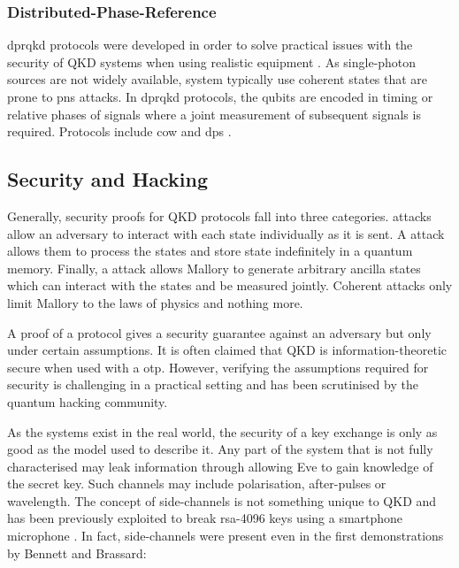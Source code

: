 
\subsubsection{Distributed-Phase-Reference}

\Ac{dprqkd} protocols were developed in order to solve practical issues with the security of \ac{QKD} systems when using realistic equipment \cite{diamanti2016practical}. As single-photon sources are not widely available, system typically use coherent states that are prone to \ac{pns} attacks. In \ac{dprqkd} protocols, the qubits are encoded in timing or relative phases of signals where a joint measurement of subsequent signals is required. Protocols include \ac{cow} \cite{COW-QKD} and \ac{dps} \cite{DPS-QKD}.

\subsection{Security and Hacking}

Generally, security proofs for \ac{QKD} protocols fall into three categories.  attacks allow an adversary to interact with each state individually as it is sent. A  attack allows them to process the states and store state indefinitely in a quantum memory. Finally, a  attack allows Mallory to generate arbitrary ancilla states which can interact with the states and be measured jointly. Coherent attacks only limit Mallory to the laws of physics and nothing more.

A proof of a protocol gives a security guarantee against an adversary but only under certain assumptions. It is often claimed that \ac{QKD} is information-theoretic secure when used with a \ac{otp}. However, verifying the assumptions required for security is challenging in a practical setting and has been scrutinised by the quantum hacking community. 

As the systems exist in the real world, the security of a key exchange is only as good as the model used to describe it. Any part of the system that is not fully characterised may leak information through  allowing Eve to gain knowledge of the secret key. Such channels may include polarisation, after-pulses or wavelength. The concept of side-channels is not something unique to \ac{QKD} and has been previously exploited to break \ac{rsa}-4096 keys using a smartphone microphone \cite{Genkin2014RSA}. In fact, side-channels were present even in the first demonstrations by Bennett and Brassard:

